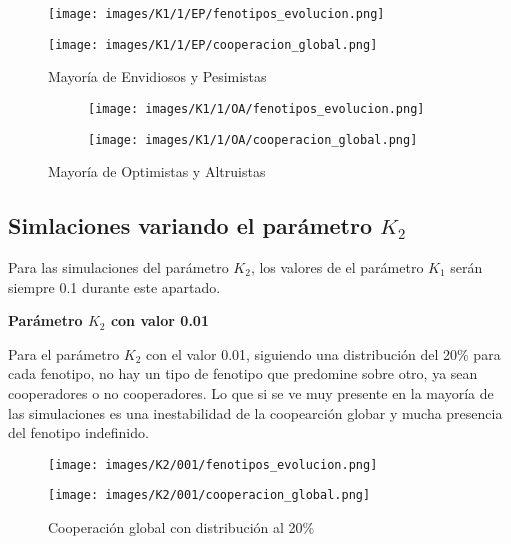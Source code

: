 \documentclass[a4paper,12pt]{report}
\begin{document}
\begin{figure}[h]
    \centering
    \begin{minipage}{0.49\textwidth}
    \centering
    \texttt{[image: images/K1/1/EP/fenotipos\_evolucion.png]}
    \label{fig:enter-label}
    \end{minipage}
    \hfill
    \begin{minipage}{0.49\textwidth}
    \centering
    \texttt{[image: images/K1/1/EP/cooperacion\_global.png]}
    \label{fig:enter-label}
    \end{minipage}
    \caption{Mayoría de Envidiosos y Pesimistas}
\end{figure}
\begin{figure}[h]
    \centering
    \begin{subfigure}[t]{0.49\textwidth}
        \centering
        \texttt{[image: images/K1/1/OA/fenotipos\_evolucion.png]}
        \label{fig:enter-label}
    \end{subfigure}
    \hfill
    \begin{subfigure}[t]{0.49\textwidth}
        \centering
        \texttt{[image: images/K1/1/OA/cooperacion\_global.png]}
        \label{fig:enter-label}
    \end{subfigure}
    \caption{Mayoría de Optimistas y Altruistas}
\end{figure}

\newpage

\subsection{Simlaciones variando el parámetro \( K_2 \)}

Para las simulaciones del parámetro \( K_2 \), los valores de el parámetro \( K_1 \) serán siempre 0.1 durante este apartado.

\vspace{1.5em}
\noindent\textbf{Parámetro \( K_2 \) con valor 0.01}
\vspace{0.5em}


Para el parámetro \( K_2 \) con el valor 0.01, siguiendo una distribución del 20\% para cada fenotipo, no hay un tipo de fenotipo que predomine sobre otro, ya sean cooperadores o no cooperadores. Lo que si se ve muy presente en la mayoría de las simulaciones es una inestabilidad de la coopearción globar y mucha presencia del fenotipo indefinido.

\begin{figure}[h!]
    \centering
    \begin{minipage}{0.49\textwidth}
    \centering
    \texttt{[image: images/K2/001/fenotipos\_evolucion.png]}
    \label{fig:enter-label}
    \end{minipage}
    \hfill
    \begin{minipage}{0.49\textwidth}
    \centering
    \texttt{[image: images/K2/001/cooperacion\_global.png]}
    \label{fig:enter-label}
    \end{minipage}
    \caption{Cooperación global con distribución al 20\%}
\end{figure}
\end{document}
